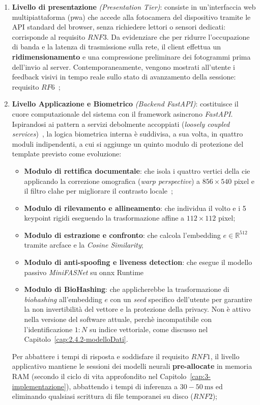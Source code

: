 \begin{enumerate}
    \item \textbf{Livello di presentazione} \textit{(Presentation Tier)}: consiste in un'interfaccia web multipiattaforma (\gls{pwa}) che accede alla fotocamera del dispositivo tramite le API standard del browser, senza richiedere lettori o sensori dedicati: corrisponde al requisito $RNF3$. 
    Da evidenziare che per ridurre l'occupazione di banda e la latenza di trasmissione sulla rete, il client effettua un \textbf{ridimensionamento} e una compressione preliminare dei fotogrammi prima dell'invio al server.
    Contemporaneamente, vengono mostrati all'utente i feedback visivi in tempo reale sullo stato di avanzamento della sessione: requisito $RF6$~\cite{kelesRepublicTurkeyIdentity2020};
    \item \textbf{Livello Applicazione e Biometrico} \textit{(Backend FastAPI)}: costituisce il cuore computazionale del sistema con il framework asincrono \textit{FastAPI}. Ispirandosi ai pattern a servizi debolmente accoppiati (\textit{loosely coupled services})~\cite{sawetsutipunFacialImageVerification2020a}, la logica biometrica interna è suddivisa, a sua volta, in quattro moduli indipendenti, a cui si aggiunge un quinto modulo di protezione del template previsto come evoluzione:
    \begin{itemize}
        \item \textbf{Modulo di rettifica documentale}: che isola i quattro vertici della \gls{cie} applicando la correzione omografica (\textit{warp perspective}) a $856 \times 540$ pixel e il filtro \gls{clahe} per migliorare il contrasto locale~\cite{groteImageQualityAssessment2026,fangIDCardIdentification2017};
        \item \textbf{Modulo di rilevamento e allineamento}: che individua il volto e i 5 keypoint rigidi eseguendo la trasformazione affine a $112 \times 112$ pixel;
        \item \textbf{Modulo di estrazione e confronto}: che calcola l'embedding $e \in \mathbb{R}^{512}$ tramite \gls{arcface} e la \textit{Cosine Similarity};
        \item \textbf{Modulo di anti-spoofing e liveness detection}: che esegue il modello passivo \textit{MiniFASNet} su \gls{onnx} Runtime
        \item \textbf{Modulo di BioHashing}: che applicherebbe la trasformazione di \textit{biohashing} all'embedding $e$ con un \textit{seed} specifico dell'utente per garantire la non invertibilità del vettore e la protezione della privacy. Non è attivo nella versione del software attuale, perchè incompatibile con l'identificazione $1:N$ su indice vettoriale, come discusso nel Capitolo~\ref{cap:2.4.2-modelloDati}.
    \end{itemize}Per abbattere i tempi di risposta e soddisfare il requisito $RNF1$, il livello applicativo mantiene le sessioni dei modelli neurali \textbf{pre-allocate} in memoria RAM (secondo il ciclo di vita approfondito nel Capitolo~\ref{cap:3-implementazione}), abbattendo i tempi di inferenza a $30{-}50~\text{ms}$ ed eliminando qualsiasi scrittura di file temporanei su disco ($RNF2$);
    

\end{enumerate}
